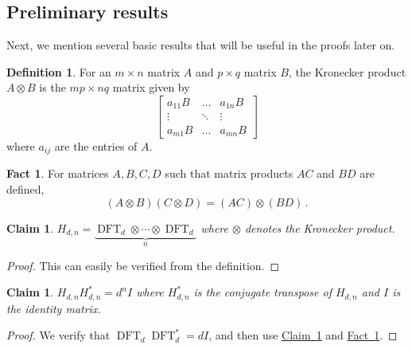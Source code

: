 \documentclass[11pt]{article}
\numberwithin{equation}{section}
\newtheorem{claim}[theorem]{Claim}
\theoremstyle{definition}
\theoremstyle{plain}
\newcommand{\expref}[2]{\hyperref[#2]{#1~\ref{#2}}}
\theoremstyle{definition}
\newtheorem{define}[theorem]{Definition}
\newtheorem{fact.}[theorem]{Fact}
\DeclareMathOperator{\DFT}{DFT}
\begin{document}
%
\subsection{Preliminary results}    %
Next, we mention several basic results that will be useful in the proofs later on.
\begin{define}
For an $m \times n$ matrix $A$ and $p \times q$ matrix $B$, the Kronecker product $A \otimes B$ is the $mp \times nq$ matrix given by
\[
\begin{bmatrix}
a_{11}B & \dots & a_{1n}B \\
\vdots & \ddots & \vdots \\
a_{m1}B & \dots & a_{mn}B
\end{bmatrix}
\]
where $a_{ij}$ are the entries of $A$.

\end{define}

%
\begin{fact.}    \label{product-kronecker}
For matrices $A,B,C,D$ such that matrix products $AC$ and $BD$ are defined,
\[
(A \otimes B)(C \otimes D) = (AC) \otimes (BD) \,.
\]
\end{fact.}
%

\begin{claim}
%
$H_{d,n} = \underbrace{\DFT_d \otimes \cdots \otimes \DFT_d}_{\text{$n$}}$
%
where $\otimes$ denotes the Kronecker product.
\end{claim}
\begin{proof}
This can easily be verified from the definition.
\end{proof}
%
%
\begin{claim}\label{orthogonal}
$H_{d,n}H_{d,n}^* = d^nI$ where $H_{d,n}^*$ is the conjugate transpose of $H_{d,n}$ and $I$ is the identity matrix.
\end{claim}
\begin{proof}
We verify that %
$\DFT_d\DFT_d^* = dI$, %
and then
%
%
use \expref{Claim}{orthogonal} and
\expref{Fact}{product-kronecker}.     %
\end{proof}

%
%
%

%
\end{document}
